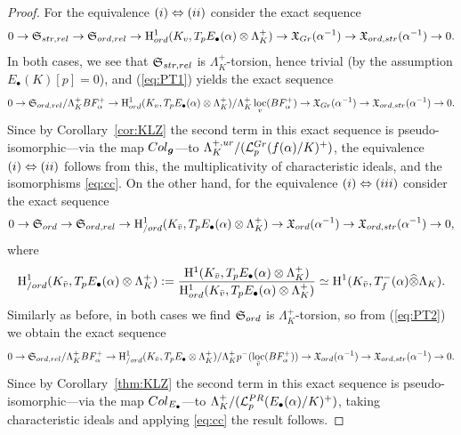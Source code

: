 \documentclass[10pt,a4paper]{amsart}
\newcommand{\Lcal}{\mathcal{L}}
\newcommand{\X}{\mathfrak{X}}
\newcommand{\bg}{\boldsymbol{g}}
\DeclareMathOperator{\loc}{loc}
\newcommand{\rH}{\mathrm{H}}
\begin{document}
\begin{proof}
For the equivalence ${\rm (i)}\Leftrightarrow{\rm (ii)}$ consider the exact sequence
\begin{equation}\label{eq:PT1}
0\rightarrow\mathfrak{S}_{\rm str,\rm rel}\rightarrow\mathfrak{S}_{\rm ord,\rm rel}\rightarrow\rH^1_{\rm ord}(K_{v},T_pE_\bullet(\alpha)\otimes\Lambda_K^+)\rightarrow\X_{\rm Gr}(\alpha^{-1})\rightarrow\X_{\rm ord,\rm str}(\alpha^{-1})\rightarrow 0.
\end{equation}
In both cases, we see that $\mathfrak{S}_{\rm str,\rm rel}$ is $\Lambda_K^+$-torsion, hence trivial (by the assumption $E_\bullet(K)[p]=0$), and (\ref{eq:PT1}) yields the exact sequence
\[
0 \to\mathfrak{S}_{\rm ord,\rm rel}/\Lambda_K^+ BF^+_{\alpha} \to\rH^1_{\rm ord}(K_{v},T_pE_\bullet(\alpha)\otimes\Lambda_K^+)/\Lambda_K^+\loc_{v}(BF_{\alpha}^+)\to\X_{\rm Gr}(\alpha^{-1})\to \X_{\rm ord,\rm str}(\alpha^{-1}) \to 0.
\]
Since by Corollary~\ref{cor:KLZ} the second term in this exact sequence is pseudo-isomorphic---via the map ${\rm Col}_{\bg}$---to $\Lambda_K^{+,\rm ur}/(\Lcal_p^{\rm Gr}(f(\alpha)/K)^+)$, the equivalence ${\rm (i)}\Leftrightarrow{\rm (ii)}$ follows from this, the multiplicativity of characteristic ideals, and the isomorphisms \eqref{eq:cc}. On the other hand, for the equivalence ${\rm (i)}\Leftrightarrow{\rm (iii)}$ consider the exact sequence
\begin{equation}\label{eq:PT2}
0\rightarrow\mathfrak{S}_{\rm ord}\rightarrow\mathfrak{S}_{\rm ord,\rm rel}\rightarrow\rH_{/\rm ord}^1(K_{\bar v},T_pE_\bullet(\alpha)\otimes\Lambda_K^+)\rightarrow\X_{\rm ord}(\alpha^{-1})\rightarrow\X_{\rm ord,\rm str}(\alpha^{-1})\rightarrow 0,
\end{equation}
where 
\[
\rH^1_{/\rm ord }(K_{\bar v},T_pE_\bullet(\alpha)\otimes\Lambda_K^+):=\frac{\rH^1(K_{\bar v},T_pE_\bullet(\alpha)\otimes\Lambda_K^+)}{\rH^1_{\rm ord }(K_{\bar v},T_pE_\bullet(\alpha)\otimes\Lambda_K^+)}\simeq\rH^1(K_{\bar v},T_f^-(\alpha)\widehat\otimes\Lambda_K).
\]
Similarly as before, in both cases we find $\mathfrak{S}_{\rm ord}$ is $\Lambda_K^+$-torsion, so from (\ref{eq:PT2}) we obtain the exact sequence
\[
0\to \mathfrak{S}_{\rm ord,\rm rel}/\Lambda_K^+ BF_{\alpha}^+ \to \rH^1_{/\rm ord}(K_{\bar{v}},T_pE_\bullet\otimes\Lambda_K^+)/\Lambda_K^+p^-(\loc_{\bar{v}}(BF_{\alpha}^+))\to \X_{\rm ord}(\alpha^{-1})\to \X_{\rm ord,\rm str}(\alpha^{-1}) \to 0.
\]
Since by Corollary~\ref{thm:KLZ} the second term in this exact sequence is pseudo-isomorphic---via the map ${\rm Col}_{E_\bullet}$---to $\Lambda_K^+/(\Lcal_p^{\rm PR}(E_\bullet(\alpha)/K)^+)$, taking characteristic ideals and applying \eqref{eq:cc} the result follows.
\end{proof}
\end{document}
